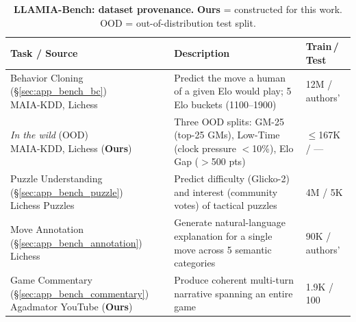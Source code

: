 \begin{table}[ht]
\centering
\small
\setlength{\tabcolsep}{5pt}
\renewcommand{\arraystretch}{1.4}
\caption{\textbf{LLAMIA-Bench: dataset provenance.} \textbf{Ours} = constructed for this work. OOD = out-of-distribution test split.}
\label{tab:bench_dataset}
\vspace{4pt}
\begin{tabular}{p{4.8cm} p{5.8cm} p{2.4cm}}
\toprule
\textbf{Task / Source} & \textbf{Description} & \textbf{Train\,/\,Test} \\
\midrule
\makecell[tl]{Behavior Cloning (\S\ref{sec:app_bench_bc}) \\ {\scriptsize MAIA-KDD, Lichess~\cite{mcilroy2020aligning}}}
  & Predict the move a human of a given Elo would play; 5 Elo buckets (1100--1900)
  & 12M / authors' \\
\makecell[tl]{\quad\emph{In the wild} (OOD) \\ {\scriptsize MAIA-KDD, Lichess (\textbf{Ours})}}
  & Three OOD splits: GM-25 (top-25 GMs), Low-Time (clock pressure $<$10\%), Elo Gap ($>$500 pts)
  & $\leq$167K / --- \\
\midrule
\makecell[tl]{Puzzle Understanding (\S\ref{sec:app_bench_puzzle}) \\ {\scriptsize Lichess Puzzles~\cite{lichess2024puzzles}}}
  & Predict difficulty (Glicko-2) and interest (community votes) of tactical puzzles
  & 4M / 5K \\
\midrule
\makecell[tl]{Move Annotation (\S\ref{sec:app_bench_annotation}) \\ {\scriptsize Lichess~\cite{jhamtani-etal-2018-learning}}}
  & Generate natural-language explanation for a single move across 5 semantic categories
  & 90K / authors' \\
\midrule
\makecell[tl]{Game Commentary (\S\ref{sec:app_bench_commentary}) \\ {\scriptsize Agadmator YouTube (\textbf{Ours})}}
  & Produce coherent multi-turn narrative spanning an entire game
  & 1.9K / 100 \\
\bottomrule
\end{tabular}
\end{table}

